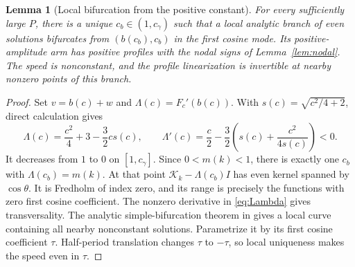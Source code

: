 \documentclass[11pt,a4paper]{article}
\newtheorem{lemma}[theorem]{Lemma}
\theoremstyle{remark}
\newcommand{\K}{\mathcal K}
\newcommand{\cg}{c_\gamma}
\begin{document}
\begin{lemma}[Local bifurcation from the positive constant]\label{lem:local}
For every sufficiently large $P$, there is a unique $c_b\in(1,\cg)$
such that a local analytic branch of even solutions bifurcates from
$(b(c_b),c_b)$ in the first cosine mode. Its positive-amplitude arm has
positive profiles with the nodal signs of Lemma~\ref{lem:nodal}. The
speed is nonconstant, and the profile linearization is invertible at
nearby nonzero points of this branch.
\end{lemma}
\begin{proof}
Set $v=b(c)+w$ and $\Lambda(c)=F_c'(b(c))$. With
$s(c)=\sqrt{c^2/4+2}$, direct calculation gives
\begin{equation}\label{eq:Lambda}
 \Lambda(c)=\frac{c^2}{4}+3-\frac32c s(c),\qquad
 \Lambda'(c)=\frac c2-\frac32\left(s(c)+\frac{c^2}{4s(c)}\right)<0.
\end{equation}
It decreases from $1$ to $0$ on $[1,\cg]$. Since $0<m(k)<1$, there
is exactly one $c_b$ with $\Lambda(c_b)=m(k)$. At that point
$\K_k-\Lambda(c_b)I$ has even kernel spanned by $\cos\theta$.
It is Fredholm of index zero, and its range is precisely the functions
with zero first cosine coefficient. The nonzero derivative in
\eqref{eq:Lambda} gives transversality. The analytic simple-bifurcation
theorem in \cite[Remark 3]{CSV} gives a local curve containing all nearby
nonconstant solutions. Parametrize it by its first cosine coefficient
$\tau$. Half-period translation changes $\tau$ to $-\tau$, so local
uniqueness makes the speed even in $\tau$.


\end{proof}
\end{document}

